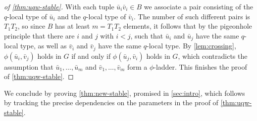 \begin{proof}[of \cref{thm:uqw-stable}]
With each tuple $\bar u_i\bar v_i\in B$ we associate a pair consisting of the $q$-local type of $\bar u_i$ and the $q$-local type of $\bar v_i$.
The number of such different pairs is $T_1T_2$, so since $B$ has at least $m=T_1T_2$ elements, it follows that 
by the pigeonhole principle that there are $i$ and $j$ 
with $i<j$, such that $\bar u_i$ and $\bar u_j$ have the same $q$-local type, as well as $\bar v_i$ and $\bar v_j$ 
 have the same $q$-local type. By \cref{lem:crossing}, $\phi(\bar u_i,\bar v_j)$ holds in $G$
 if and only if $\phi(\bar u_j,\bar v_i)$ holds in $G$, which contradicts the assumption that $\bar u_1,\ldots,\bar u_m$ and $\bar v_1,\ldots,\bar v_m$ form a $\phi$-ladder.
 This finishes the proof of \cref{thm:uqw-stable}.
\end{proof}


We conclude by proving \cref{thm:new-stable}, promised in \cref{sec:intro}, which follows by tracking the precise dependencies on the parameters in the proof of \cref{thm:uqw-stable}.

